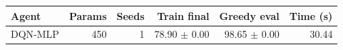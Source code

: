 \begin{tabular}{lrrrrr}
\hline
Agent & Params & Seeds & Train final & Greedy eval & Time (s) \\
\hline
DQN-MLP & 450 & 1 & 78.90 $\pm$ 0.00 & 98.65 $\pm$ 0.00 & 30.44 \\
\hline
\end{tabular}

